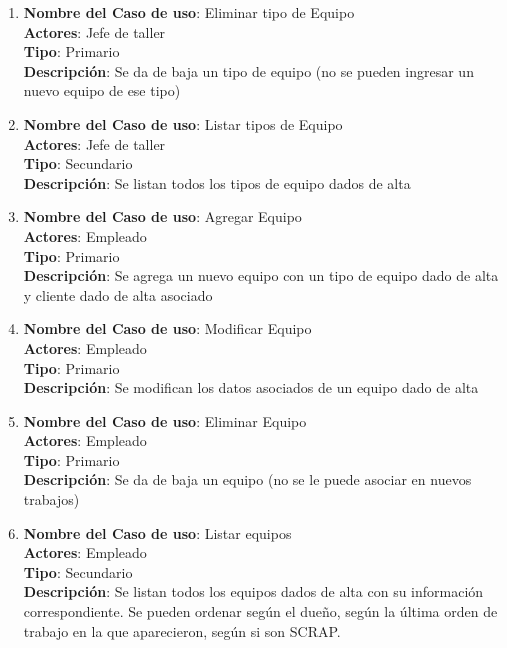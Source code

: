 \documentclass[12pt]{extarticle}
\begin{document}
\begin{spacing}{1.2}
\begin{enumerate}
            \item 	\textbf{Nombre del Caso de uso}: Eliminar tipo de Equipo\\
                    \textbf{Actores}: Jefe de taller\\
                    \textbf{Tipo}: Primario\\
                    \textbf{Descripción}: Se da de baja un tipo de equipo (no se pueden ingresar un nuevo equipo de ese tipo)
            
            \item 	\textbf{Nombre del Caso de uso}: Listar tipos de Equipo\\
                    \textbf{Actores}: Jefe de taller\\
                    \textbf{Tipo}: Secundario\\
                    \textbf{Descripción}: Se listan todos los tipos de equipo dados de alta
            
            \item 	\textbf{Nombre del Caso de uso}: Agregar Equipo\\
                    \textbf{Actores}: Empleado\\
                    \textbf{Tipo}: Primario\\
                    \textbf{Descripción}: Se agrega un nuevo equipo con un tipo de equipo dado de alta y cliente dado de alta asociado
            
            \item 	\textbf{Nombre del Caso de uso}: Modificar Equipo\\
                    \textbf{Actores}: Empleado\\
                    \textbf{Tipo}: Primario\\
                    \textbf{Descripción}: Se modifican los datos asociados de un equipo dado de alta
            
            \item 	\textbf{Nombre del Caso de uso}: Eliminar Equipo\\
                    \textbf{Actores}: Empleado\\
                    \textbf{Tipo}: Primario\\
                    \textbf{Descripción}: Se da de baja un equipo (no se le puede asociar en nuevos trabajos)
            
            \item 	\textbf{Nombre del Caso de uso}: Listar equipos\\
                    \textbf{Actores}: Empleado\\
                    \textbf{Tipo}: Secundario\\
                    \textbf{Descripción}: Se listan todos los equipos dados de alta con su información correspondiente. Se pueden ordenar según el dueño, según la última orden de trabajo en la que aparecieron, según si son SCRAP.




\end{enumerate}
\end{spacing}
\end{document}
